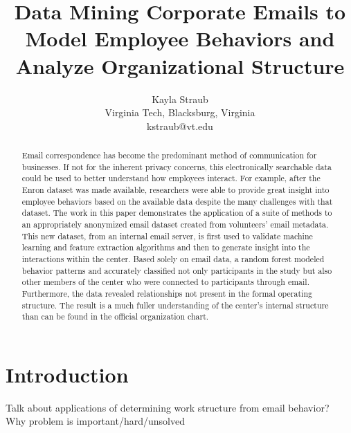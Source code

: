 \documentclass{article}
\begin{document}
\title{Data Mining Corporate Emails to Model Employee Behaviors and Analyze Organizational Structure}
\author{Kayla Straub\\
        Virginia Tech, Blacksburg, Virginia\\
        kstraub@vt.edu}
\maketitle

\begin{abstract}
Email correspondence has become the predominant method of communication for businesses.  If not for the inherent privacy concerns, this electronically searchable data could be used to better understand how employees interact. For example, after the Enron dataset was made available, researchers were able to provide great insight into employee behaviors based on the available data despite the many challenges with that dataset.  The work in this paper demonstrates the application of a suite of methods to an appropriately anonymized email dataset created from volunteers' email metadata.  This new dataset, from an internal email server, is first used to validate machine learning and feature extraction algorithms and then to generate insight into the interactions within the center.  Based solely on email data, a random forest  modeled behavior patterns and accurately classified not only participants in the study but also other members of the center who were connected to participants through email.  Furthermore, the data revealed relationships not present in the formal operating structure.  The result is a much fuller understanding of the center's internal structure than can be found in the official organization chart.
\end{abstract}

\section{Introduction}
Talk about applications of determining work structure from email behavior? \\
Why problem is important/hard/unsolved\\
\end{document}
